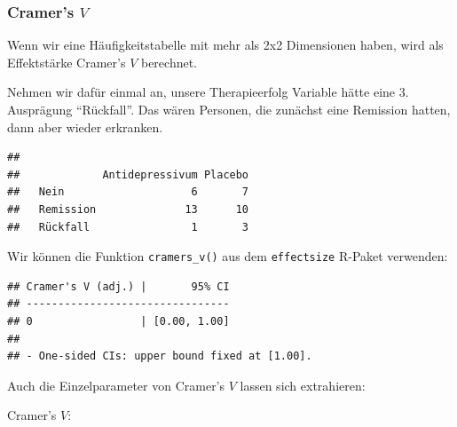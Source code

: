 \documentclass[
]{book}
\newenvironment{Shaded}{\begin{snugshade}}{\end{snugshade}}
\newcommand{\FunctionTok}[1]{\textcolor[rgb]{0.13,0.29,0.53}{\textbf{#1}}}
\newcommand{\NormalTok}[1]{#1}
\newcommand{\SpecialCharTok}[1]{\textcolor[rgb]{0.81,0.36,0.00}{\textbf{#1}}}
\begin{document}
\subsubsection{\texorpdfstring{Cramer's \(V\)}{Cramer's V}}\label{cramers-v}

Wenn wir eine Häufigkeitstabelle mit mehr als 2x2 Dimensionen haben, wird als Effektstärke Cramer's \(V\) berechnet.

Nehmen wir dafür einmal an, unsere Therapieerfolg Variable hätte eine 3. Ausprägung ``Rückfall''. Das wären Personen, die zunächst eine Remission hatten, dann aber wieder erkranken.

\begin{Shaded}
\end{Shaded}

\begin{verbatim}
##            
##             Antidepressivum Placebo
##   Nein                    6       7
##   Remission              13      10
##   Rückfall                1       3
\end{verbatim}

Wir können die Funktion \texttt{cramers\_v()} aus dem \texttt{effectsize} R-Paket verwenden:

\begin{Shaded}
\end{Shaded}

\begin{verbatim}
## Cramer's V (adj.) |       95% CI
## --------------------------------
## 0                 | [0.00, 1.00]
## 
## - One-sided CIs: upper bound fixed at [1.00].
\end{verbatim}

Auch die Einzelparameter von Cramer's \(V\) lassen sich extrahieren:

Cramer's \(V\):

\begin{Shaded}
\end{Shaded}
\end{document}
